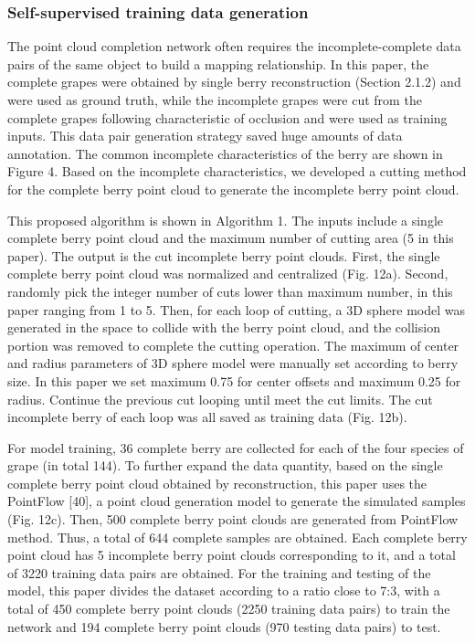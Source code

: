 \documentclass[12pt]{article}
\begin{document}

\subsubsection{Self-supervised training data generation}

The point cloud completion network often requires the incomplete-complete data pairs of the same object to build a mapping relationship. 
In this paper, the complete grapes were obtained by single berry reconstruction 
(Section 2.1.2) and were used as ground truth, while the incomplete grapes were cut from the complete grapes following characteristic of occlusion and were used as training inputs. 
This data pair generation strategy saved huge amounts of data annotation. The common incomplete characteristics of the berry are shown in Figure 4.
Based on the incomplete characteristics, we developed a cutting method for the complete berry point cloud to generate the incomplete berry point cloud.


This proposed algorithm is shown in Algorithm 1. 
The inputs include a single complete berry point cloud and the maximum number of cutting area (5 in this paper). 
The output is the cut incomplete berry point clouds. First, the single complete berry point cloud was normalized and centralized (Fig. 12a). 
Second, randomly pick the integer number of cuts lower than maximum number, in this paper ranging from 1 to 5. 
Then, for each loop of cutting, a 3D sphere model was generated in the space to collide with the berry point cloud, and the collision portion was removed to complete the cutting operation. 
The maximum of center and radius parameters of 3D sphere model were manually set according to berry size. 
In this paper we set maximum 0.75 for center offsets and maximum 0.25 for radius. 
Continue the previous cut looping until meet the cut limits. The cut incomplete berry of each loop was all saved as training data (Fig. 12b). 



For model training, 36 complete berry are collected for each of the four species of grape (in total 144). 
To further expand the data quantity, based on the single complete berry point cloud obtained by reconstruction, this paper uses the PointFlow [40], a point cloud generation model to generate the simulated samples (Fig. 12c). 
Then, 500 complete berry point clouds are generated from PointFlow method. 
Thus, a total of 644 complete samples are obtained. 
Each complete berry point cloud has 5 incomplete berry point clouds corresponding to it, and a total of 3220 training data pairs are obtained. 
For the training and testing of the model, this paper divides the dataset according to a ratio close to 7:3, with a total of 450 complete berry point clouds (2250 training data pairs) to train the network and 194 complete berry point clouds (970 testing data pairs) to test.
\end{document}
